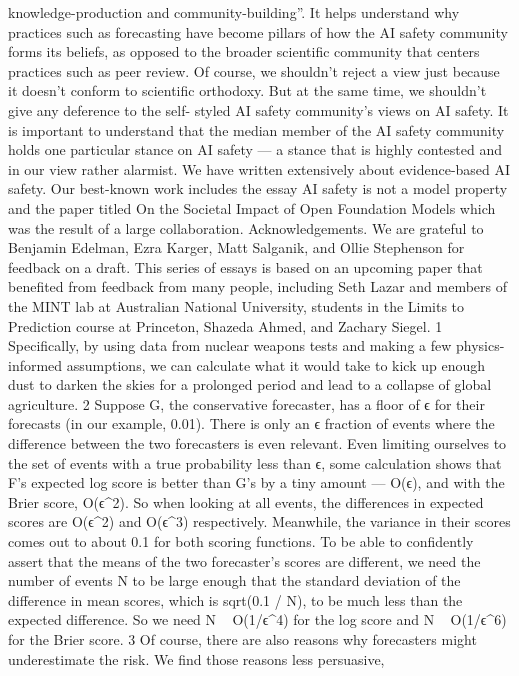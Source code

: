 knowledge-production and community-building”. It helps
understand why practices such as forecasting have become
pillars of how the AI safety community forms its beliefs, as
opposed to the broader scientiﬁc community that centers
practices such as peer review. Of course, we shouldn’t reject a
view just because it doesn’t conform to scientiﬁc orthodoxy. But
at the same time, we shouldn’t give any deference to the self-
styled AI safety community’s views on AI safety. It is important
to understand that the median member of the AI safety
community holds one particular stance on AI safety — a stance
that is highly contested and in our view rather alarmist.
We have written extensively about evidence-based AI safety.
Our best-known work includes the essay AI safety is not a
model property and the paper titled On the Societal Impact of
Open Foundation Models which was the result of a large
collaboration.
Acknowledgements. We are grateful to Benjamin Edelman, Ezra
Karger, Matt Salganik, and Ollie Stephenson for feedback on a draft.
This series of essays is based on an upcoming paper that beneﬁted
from feedback from many people, including Seth Lazar and members
of the MINT lab at Australian National University, students in the
Limits to Prediction course at Princeton, Shazeda Ahmed, and
Zachary Siegel.
1
Speciﬁcally, by using data from nuclear weapons tests and
making a few physics-informed assumptions, we can calculate
what it would take to kick up enough dust to darken the skies for
a prolonged period and lead to a collapse of global agriculture.
2
Suppose G, the conservative forecaster, has a ﬂoor of ϵ for their
forecasts (in our example, 0.01). There is only an ϵ fraction of
events where the difference between the two forecasters is even
relevant. Even limiting ourselves to the set of events with a true
probability less than ϵ, some calculation shows that F’s expected
log score is better than G’s by a tiny amount — O(ϵ), and with
the Brier score, O(ϵ^2). So when looking at all events, the
differences in expected scores are O(ϵ^2) and O(ϵ^3)
respectively. Meanwhile, the variance in their scores comes out
to about 0.1 for both scoring functions. To be able to conﬁdently
assert that the means of the two forecaster’s scores are different,
we need the number of events N to be large enough that the
standard deviation of the difference in mean scores, which is
sqrt(0.1 / N), to be much less than the expected difference. So
we need N ~ O(1/ϵ^4) for the log score and N ~ O(1/ϵ^6) for the
Brier score.
3
Of course, there are also reasons why forecasters might
underestimate the risk. We ﬁnd those reasons less persuasive,
